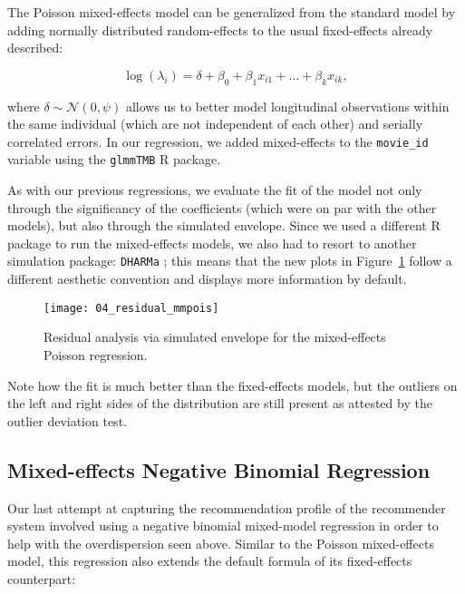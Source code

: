 The Poisson mixed-effects model can be generalized from the standard model by
adding normally distributed random-effects to the usual fixed-effects already
described:


$$
\log(\lambda_i) = \delta + \beta_0 + \beta_1 x_{i1} + \dots + \beta_k x_{ik},
$$

\noindent where $\delta \sim \mathcal{N}(0,\psi)$ allows us to better model
longitudinal observations within the same individual (which are not independent
of each other) and serially correlated errors. In our regression, we added
mixed-effects to the \verb|movie_id| variable using the \verb|glmmTMB| \citep{}
R package.

As with our previous regressions, we evaluate the fit of the model not only
through the significancy of the coefficients (which were on par with the other
models), but also through the simulated envelope. Since we used a different R
package to run the mixed-effects models, we also had to resort to another
simulation package: \verb|DHARMa| \citep{}; this means that the new plots in
Figure~\ref{fig:fig04_residual_mmpois} follow a different aesthetic convention
and displays more information by default.

\begin{figure}
  \centering
  \texttt{[image: 04\_residual\_mmpois]}
  \caption{Residual analysis via simulated envelope for the mixed-effects Poisson regression.\label{fig:fig04_residual_mmpois}}
\end{figure}

Note how the fit is much better than the fixed-effects models, but the outliers
on the left and right sides of the distribution are still present as attested by
the outlier deviation test.

\subsection{Mixed-effects Negative Binomial Regression}
\label{subsec:mmnegbin04}

Our last attempt at capturing the recommendation profile of the recommender
system involved using a negative binomial mixed-model regression in order to
help with the overdispersion seen above. Similar to the Poisson mixed-effects
model, this regression also extends the default formula of its fixed-effects
counterpart:

